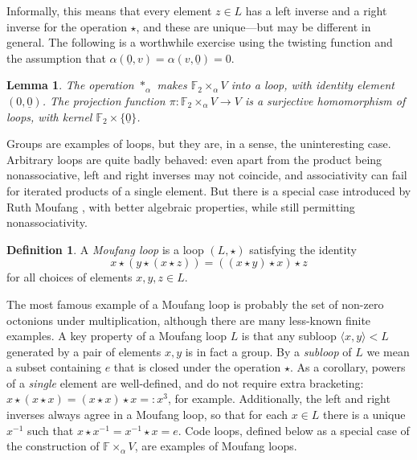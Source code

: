 \documentclass{article}
\theoremstyle{plain}
\newtheorem{lemma}{Lemma}
\theoremstyle{definition}
\newtheorem*{definition}{Definition}
\def \FF {\mathbb{F}}
\begin{document}
Informally, this means that every element $z\in L$ has a left inverse and a right inverse for the operation $\star$, and these are unique---but may be different in general. 
The following is a worthwhile exercise using the twisting function and the assumption that $\alpha(\underline{0},v)=\alpha(v,\underline{0})=0$.

\begin{lemma}
The operation $\ast_\alpha$ makes $\FF_2\times_\alpha V$ into a loop, with identity element $(0,\underline{0})$.
The projection function $\pi\colon \FF_2\times_\alpha V \to V$ is a surjective homomorphism of loops, with kernel $\FF_2 \times\{\underline{0}\}$.
\end{lemma}

Groups are examples of loops, but they are, in a sense, the uninteresting case. 
Arbitrary loops are quite badly behaved: even apart from the product being nonassociative, left and right inverses may not coincide, and associativity can fail for iterated products of a single element. 
But there is a special case introduced by Ruth Moufang \cite{Moufang}, with better algebraic properties, while still permitting nonassociativity.

\begin{definition}
A \emph{Moufang loop} is a loop $(L,\star)$ satisfying the identity
\[
x \star (y \star (x \star z)) = ((x \star y) \star x) \star z
\]
for all choices of elements $x,y,z\in L$.
\end{definition}

The most famous example of a Moufang loop is probably the set of non-zero octonions under multiplication, although there are many less-known finite examples. 
A key property of a Moufang loop $L$ is that any subloop $\langle x,y\rangle < L$ generated by a pair of elements $x,y$ is in fact a group. 
By a \emph{subloop} of $L$ we mean a subset containing $e$ that is closed under the operation $\star$.
As a corollary, powers of a \emph{single} element are well-defined, and do not require extra bracketing: $x\star (x \star x) = (x\star x) \star x =: x^3$, for example. 
Additionally, the left and right inverses always agree in a Moufang loop, so that for each $x\in L$ there is a unique $x^{-1}$ such that $x\star x^{-1} = x^{-1}\star x = e$. 
Code loops, defined below as a special case of the construction of $\FF\times_\alpha V$, are examples of Moufang loops.
\end{document}
